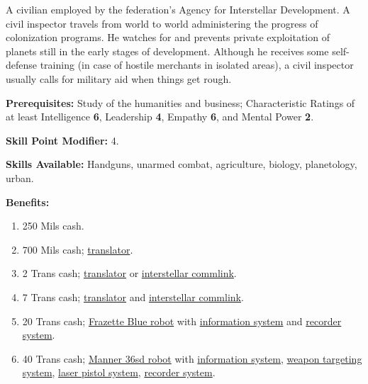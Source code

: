 \bigskip

\pagebreak[2]


\label{sec:prof-civil-inspector}

A civilian employed by the federation's Agency for Interstellar
Development. A civil inspector travels from world to world
administering the progress of colonization programs. He watches for
and prevents private exploitation of planets still in the early stages
of development. Although he receives some self-defense training (in
case of hostile merchants in isolated areas), a civil inspector
usually calls for military aid when things get rough.

\textbf{Prerequisites:} Study of the humanities and business;
Characteristic Ratings of at least Intelligence \textbf{6}, Leadership
\textbf{4}, Empathy \textbf{6}, and Mental Power \textbf{2}.

\textbf{Skill Point Modifier:} 4.  

\textbf{Skills Available:}  Handguns, unarmed combat, agriculture,
  biology, planetology, urban.

\pagebreak[2]
\textbf{Benefits:}

\begin{enumerate}
\item 250 Mils cash.
\item  700 Mils cash; \hyperlink{tag:translator}{translator}.
\item  2 Trans cash; \hyperlink{tag:translator}{translator} or \hyperlink{tag:commlink}{interstellar commlink}.
\item  7 Trans cash; \hyperlink{tag:translator}{translator} and \hyperlink{tag:commlink}{interstellar commlink}.
\item 20 Trans cash; \hyperlink{tag:bot-frazette-blue}{Frazette Blue
  robot} with \hyperlink{tag:bot-information}{information system} and 
  \hyperlink{tag:bot-recorder}{recorder system}.
\item 40 Trans cash; \hyperlink{tag:bot-manner-36sd}{Manner 36sd robot} with \hyperlink{tag:bot-information}{information system},
  \hyperlink{tag:bot-weapon-target}{weapon targeting system}, \hyperlink{tag:bot-weapon}{laser pistol system}, \hyperlink{tag:bot-recorder}{recorder system}.
\end{enumerate}

\bigskip

\pagebreak[2]

\label{sec:prof-colonist}

